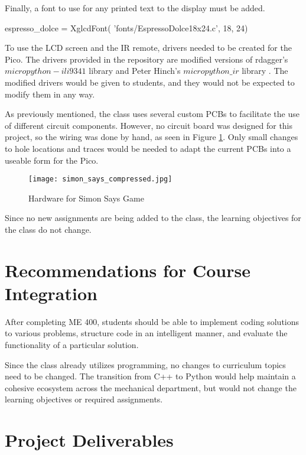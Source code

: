 \begin{tcolorbox}[breakable, enhanced jigsaw, title=ME 400: Assignment \ref{comp_app_assignment_1}, 
    colframe=ksu-purple, colback=ksu-gray]
Finally, a font to use for any printed text to the display must be added.

\begin{python}
espresso_dolce = XglcdFont(
    'fonts/EspressoDolce18x24.c', 18, 24)
\end{python}
\end{tcolorbox}

To use the LCD screen and the IR remote, drivers needed to be created for the Pico. 
The drivers provided in the repository are modified versions of
rdagger's $micropython-ili9341$ library \cite{micropython-ili9341} and Peter Hinch's 
$micropython\_ir$ library \cite{micropython_ir2020}. The modified drivers would be given to 
students, and they would not be expected to modify them in any way.

As previously mentioned, the class uses several custom PCBs to facilitate the use
of different circuit components. However, no circuit board was designed for this 
project, so the wiring was done by hand, as seen in Figure \ref{fig:simon_says}. Only 
small changes to hole locations and traces would be needed to adapt the current PCBs 
into a useable form for the Pico.

\begin{figure}[h]
    \texttt{[image: simon\_says\_compressed.jpg]}
    \centering
    \caption{Hardware for Simon Says Game}
    \centering
    \label{fig:simon_says}
\end{figure}

Since no new assignments are being added to the class, the learning objectives for the 
class do not change.

\section{Recommendations for Course Integration}

After completing ME 400, students should be able to implement coding solutions to
various problems, structure code in an intelligent manner, and evaluate the functionality
of a particular solution. 

Since the class already utilizes programming, no changes to curriculum topics need to 
be changed. The transition from C++ to Python would help maintain a cohesive ecosystem
across the mechanical department, but would not change the learning objectives or required
assignments.

\section{Project Deliverables}

